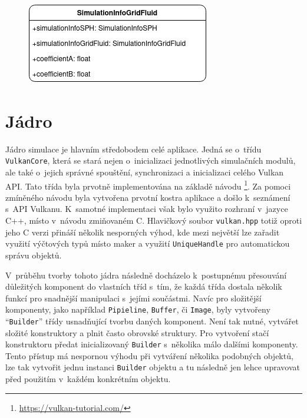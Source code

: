 \begin{figure}[hbt]
	\centering
	\captionsetup{justification=centering}
	\includegraphics[scale=0.6]{obrazky-figures/SimulationInfo.png}
	\label{fig:structsEvap}
\end{figure}


\section{Jádro}
\label{chapter:jadro}

Jádro simulace je hlavním středobodem celé aplikace. Jedná se o~třídu \texttt{VulkanCore}, která se stará nejen o~inicializaci jednotlivých simulačních modulů, ale také o~jejich správné spouštění, synchronizaci a inicializaci celého Vulkan API. Tato třída byla prvotně implementována na základě návodu \footnote{\url{https://vulkan-tutorial.com/}}. Za pomoci zmíněného návodu byla vytvořena prvotní kostra aplikace a došlo k~seznámení s~API Vulkanu. K~samotné implementaci však bylo využito rozhraní v~jazyce C++, místo v~návodu zmiňovaném C. Hlavičkový soubor \texttt{vulkan.hpp} totiž oproti jeho C verzi přináší několik nesporných výhod, kde mezi největší lze zařadit využití výčtových typů místo maker a využití \texttt{UniqueHandle} pro automatickou správu objektů. 

V~průběhu tvorby tohoto jádra následně docházelo k~postupnému přesouvání důležitých komponent do vlastních tříd s~tím, že každá třída dostala několik funkcí pro snadnější manipulaci s~jejími součástmi. Navíc pro složitější komponenty, jako například \texttt{Pipieline}, \texttt{Buffer}, či \texttt{Image}, byly vytvořeny \enquote{\texttt{Builder}} třídy usnadňující tvorbu daných komponent. Není tak nutné, vytvářet složité konstruktory a plnit často obrovské struktury. Pro vytvoření stačí konstruktoru předat inicializovaný \texttt{Builder} s~několika málo dalšími komponenty. Tento přístup má nespornou výhodu při vytváření několika podobných objektů, lze tak vytvořit jednu instanci \texttt{Builder} objektu a tu následně jen lehce upravovat před použitím v~každém konkrétním objektu.

